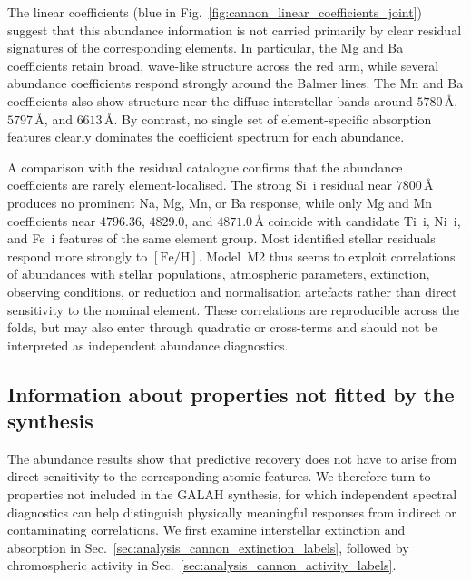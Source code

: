 \documentclass[twocolumn,apj,numberedappendix,appendixfloats]{openjournal}
\begin{document}
The linear coefficients (blue in Fig.~\ref{fig:cannon_linear_coefficients_joint}) suggest that this abundance information is not carried primarily by clear residual signatures of the corresponding elements. In particular, the Mg and Ba coefficients retain broad, wave-like structure across the red arm, while several abundance coefficients respond strongly around the Balmer lines. The Mn and Ba coefficients also show structure near the diffuse interstellar bands around $5780\,\text{\AA}$, $5797\,\text{\AA}$, and $6613\,\text{\AA}$. By contrast, no single set of element-specific absorption features clearly dominates the coefficient spectrum for each abundance.

A comparison with the residual catalogue confirms that the abundance coefficients are rarely element-localised. The strong Si~{\sc i} residual near $7800\,\text{\AA}$ produces no prominent Na, Mg, Mn, or Ba response, while only Mg and Mn coefficients near $4796.36$, $4829.0$, and $4871.0\,\text{\AA}$ coincide with candidate Ti~{\sc i}, Ni~{\sc i}, and Fe~{\sc i} features of the same element group. Most identified stellar residuals respond more strongly to $[\mathrm{Fe/H}]$. Model~\textcolor{M2}{M2} thus seems to exploit correlations of abundances with stellar populations, atmospheric parameters, extinction, observing conditions, or reduction and normalisation artefacts rather than direct sensitivity to the nominal element. These correlations are reproducible across the folds, but may also enter through quadratic or cross-terms and should not be interpreted as independent abundance diagnostics.

\subsection{Information about properties not fitted by the synthesis}
\label{sec:analysis_cannon_unfitted_labels}

The abundance results show that predictive recovery does not have to arise from direct sensitivity to the corresponding atomic features. We therefore turn to properties not included in the GALAH synthesis, for which independent spectral diagnostics can help distinguish physically meaningful responses from indirect or contaminating correlations. We first examine interstellar extinction and absorption in Sec.~\ref{sec:analysis_cannon_extinction_labels}, followed by chromospheric activity in Sec.~\ref{sec:analysis_cannon_activity_labels}.

\end{document}
